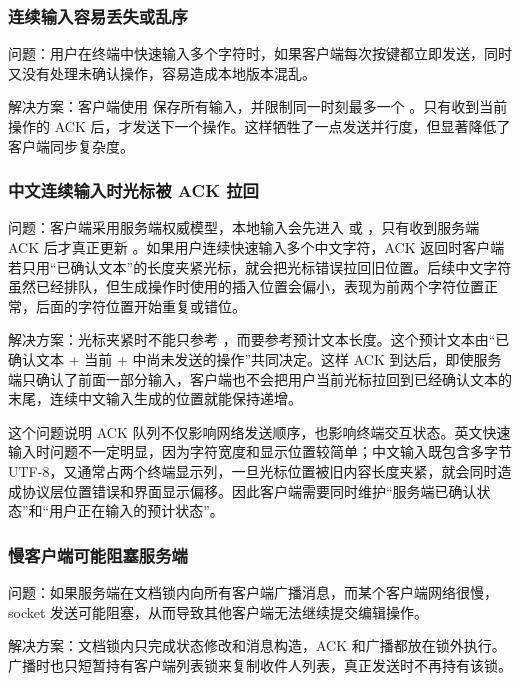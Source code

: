 \subsubsection{连续输入容易丢失或乱序}

问题：用户在终端中快速输入多个字符时，如果客户端每次按键都立即发送，同时又没有处理未确认操作，容易造成本地版本混乱。

解决方案：客户端使用  保存所有输入，并限制同一时刻最多一个 。只有收到当前操作的 ACK 后，才发送下一个操作。这样牺牲了一点发送并行度，但显著降低了客户端同步复杂度。

\subsubsection{中文连续输入时光标被 ACK 拉回}

问题：客户端采用服务端权威模型，本地输入会先进入  或 ，只有收到服务端 ACK 后才真正更新 。如果用户连续快速输入多个中文字符，ACK 返回时客户端若只用“已确认文本”的长度夹紧光标，就会把光标错误拉回旧位置。后续中文字符虽然已经排队，但生成操作时使用的插入位置会偏小，表现为前两个字符位置正常，后面的字符位置开始重复或错位。

解决方案：光标夹紧时不能只参考 ，而要参考预计文本长度。这个预计文本由“已确认文本 + 当前  +  中尚未发送的操作”共同决定。这样 ACK 到达后，即使服务端只确认了前面一部分输入，客户端也不会把用户当前光标拉回到已经确认文本的末尾，连续中文输入生成的位置就能保持递增。

这个问题说明 ACK 队列不仅影响网络发送顺序，也影响终端交互状态。英文快速输入时问题不一定明显，因为字符宽度和显示位置较简单；中文输入既包含多字节 UTF-8，又通常占两个终端显示列，一旦光标位置被旧内容长度夹紧，就会同时造成协议层位置错误和界面显示偏移。因此客户端需要同时维护“服务端已确认状态”和“用户正在输入的预计状态”。

\subsubsection{慢客户端可能阻塞服务端}

问题：如果服务端在文档锁内向所有客户端广播消息，而某个客户端网络很慢，socket 发送可能阻塞，从而导致其他客户端无法继续提交编辑操作。

解决方案：文档锁内只完成状态修改和消息构造，ACK 和广播都放在锁外执行。广播时也只短暂持有客户端列表锁来复制收件人列表，真正发送时不再持有该锁。

